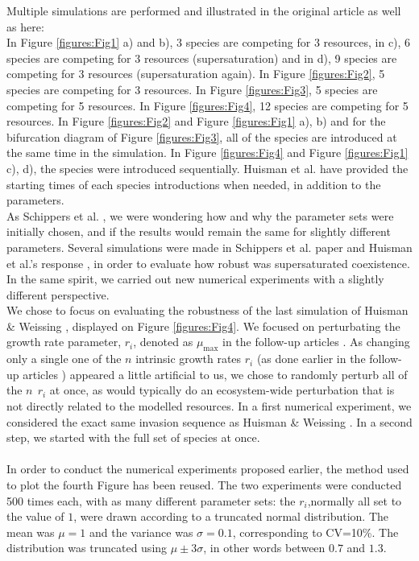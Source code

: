 Multiple simulations are performed and illustrated in the original article as well as here: \\
In Figure \ref{figures:Fig1} a) and b), 3 species are competing for 3 resources, in c), 6 species are competing for 3 resources (supersaturation) and in d), 9 species are competing for 3 resources (supersaturation again). In Figure \ref{figures:Fig2}, 5 species are competing for 3 resources. In Figure \ref{figures:Fig3}, 5 species are competing for 5 resources. In Figure \ref{figures:Fig4}, 12 species are competing for 5 resources. In Figure \ref{figures:Fig2} and Figure \ref{figures:Fig1} a), b) and for the bifurcation diagram of Figure \ref{figures:Fig3}, all of the species are introduced at the same time in the simulation. In Figure \ref{figures:Fig4} and Figure \ref{figures:Fig1} c), d), the species were introduced sequentially. Huisman et al. \cite{1999:Huisman} have provided the starting times of each species introductions when needed, in addition to the parameters.\\


As Schippers et al. \cite{2008:Schippers}, we were wondering how and why the parameter sets were initially chosen, and if the results would remain the same for slightly different parameters. Several simulations were made in Schippers et al. paper \cite{2008:Schippers} and Huisman et al.'s response \cite{2008:Huisman}, in order to evaluate how robust was supersaturated coexistence. In the same spirit, we carried out new numerical experiments with a slightly different perspective.\\

We chose to focus on evaluating the robustness of the last simulation of Huisman \& Weissing \cite{1999:Huisman}, displayed on Figure \ref{figures:Fig4}. We focused on perturbating the growth rate parameter, $r_i$, denoted as $\mu_{\text{max}}$ in the follow-up articles \cite{2008:Schippers,2008:Huisman}. As changing only a single one of the $n$ intrinsic growth rates $r_i$ (as done earlier in the follow-up articles \cite{2008:Schippers,2008:Huisman}) appeared a little artificial to us, we chose to randomly perturb all of the $n~~r_i$ at once, as would typically do an ecosystem-wide perturbation that is not directly related to the modelled resources. 
In a first numerical experiment, we considered the exact same invasion sequence as Huisman \& Weissing \cite{1999:Huisman}. 
In a second step, we started with the full set of species at once.\\
\\
In order to conduct the numerical experiments proposed earlier, the method used to plot the fourth Figure has been reused. The two experiments were conducted 500 times each, with as many different parameter sets: the $r_i$,normally all set to the value of $1$, were drawn according to a truncated normal distribution. The mean was $\mu=1$ and the variance was $\sigma=0.1$, corresponding to CV=10\%. The distribution was truncated using $\mu\pm3\sigma$, in other words between $0.7$ and $1.3$.\\~\\ 

